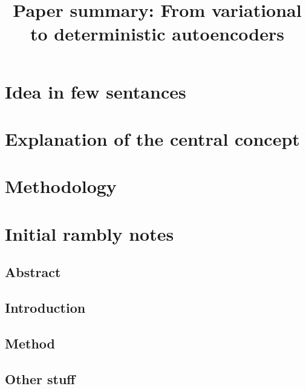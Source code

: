 \documentclass{article}
\title{Paper summary: From variational to deterministic autoencoders}
\begin{document}
\maketitle


\section{Idea in few sentances}


\section{Explanation of the central concept}


\section{Methodology}


\section{Initial rambly notes}


\subsection{Abstract}


\subsection{Introduction}


\subsection{Method}

\subsection{Other stuff}
\end{document}
